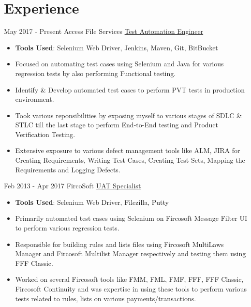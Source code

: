 \documentclass[letterpaper]{sidebarcv} %
\begin{document}
\section{Experience}
\begin{twenty}
	\twentyitem
    	{May 2017 -}
		{Present}
        {Access File Services}
        {\href{}{Test Automation Engineer}}
        {}
        {
        {\begin{itemize}
        \item \textbf {Tools Used}: Selenium Web Driver, Jenkins, Maven, Git, BitBucket
        \item Focused on automating test cases using Selenium and Java for various regression tests by also performing Functional testing. 
        \item Identify \& Develop automated test cases to perform PVT tests in production environment.
        \item Took various reponsibilities by exposing myself to various stages of SDLC \& STLC till the last stage to perform End-to-End testing and Product Verification Testing. 
        \item Extensive exposure to various defect management tools like ALM, JIRA for Creating Requirements, Writing Test Cases, Creating Test Sets, Mapping the Requirements and Logging Defects. \vspace{2mm}
		\end{itemize}}
        }
	\twentyitem
    	{Feb 2013 -}
		{Apr 2017}
        {FircoSoft}
        {\href{}{UAT Specialist}}
        {}
        {
        {\begin{itemize}
        \item \textbf {Tools Used}: Selenium Web Driver, Filezilla, Putty
        \item Primarily automated test cases using Selenium on Fircosoft Message Filter UI to perform various regression tests.
        \item Responsible for building rules and lists files using Fircosoft MultiLaws Manager and Fircosoft Multilist Manager respectively and testing them using FFF Classic.
        \item Worked on several Fircosoft tools like FMM, FML, FMF, FFF, FFF Classic, Fircosoft Continuity and was expertise in using these tools to perform various tests related to rules, lists on various payments/transactions.
		\end{itemize}}
        }
\end{twenty}
\end{document}
